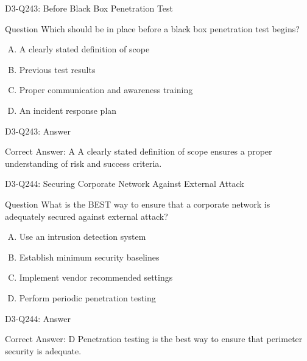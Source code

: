 \documentclass{beamer}
\begin{document}
	\begin{frame}{D3-Q243: Before Black Box Penetration Test}
		\begin{block}{Question}
			Which should be in place before a black box penetration test begins?
		\end{block}
		\begin{enumerate}[(A)]
			\item A clearly stated definition of scope
			\item Previous test results
			\item Proper communication and awareness training
			\item An incident response plan
		\end{enumerate}
	\end{frame}
	\begin{frame}{D3-Q243: Answer}
		\begin{block}{Correct Answer: A}
			A clearly stated definition of scope ensures a proper understanding of risk and success criteria.
		\end{block}
	\end{frame}
	
	\begin{frame}{D3-Q244: Securing Corporate Network Against External Attack}
		\begin{block}{Question}
			What is the BEST way to ensure that a corporate network is adequately secured against external attack?
		\end{block}
		\begin{enumerate}[(A)]
			\item Use an intrusion detection system
			\item Establish minimum security baselines
			\item Implement vendor recommended settings
			\item Perform periodic penetration testing
		\end{enumerate}
	\end{frame}
	\begin{frame}{D3-Q244: Answer}
		\begin{block}{Correct Answer: D}
			Penetration testing is the best way to ensure that perimeter security is adequate.
		\end{block}
	\end{frame}
	
\end{document}
